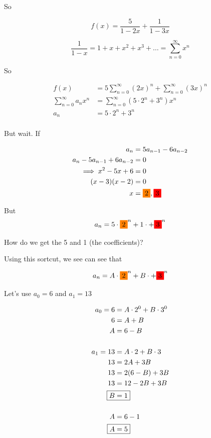 \documentclass[../../Main.tex]{subfiles}
\begin{document}
So

$$\boxed{f(x) = \frac{5}{1 - 2x} + \frac{1}{1 - 3x}}$$

\begin{recall}
    $$\frac{1}{1 - x} = 1 + x + x^2 + x^3 + \ldots = \sum_{n = 0}^{\infty} x^n$$ 
\end{recall}

So 

\begin{align*}
    f(x) &= 5 \sum_{n = 0}^{\infty} (2x)^n + \sum_{n = 0}^{\infty} (3x)^n \\
    \sum_{n = 0}^{\infty} a_n x^n &= \sum_{n = 0}^{\infty}(5 \cdot 2^n + 3^n)x^n \\
    a_n &= 5 \cdot 2^n + 3^n \\
\end{align*}

But wait. If

\begin{align*}
    a_n &= 5a_{n - 1} - 6a_{n - 2} \\
    a_n - 5a_{n - 1} + 6a_{n - 2} &= 0 \\
    \implies x^2 - 5x + 6 &= 0 \\
    (x - 3)(x - 2) &= 0 \\
    x &= \orangebox{2}, \redbox{3} \\
\end{align*}

But $$a_n = 5 \cdot \orangebox{2}^n + 1 \cdot + \redbox{3}^n$$

How do we get the 5 and 1 (the coefficients)?

Using this sortcut, we see can see that

$$a_n = A \cdot \orangebox{2}^n + B \cdot + \redbox{3}^n$$

Let's use $a_0 = 6$ and $a_1 = 13$

\begin{align*}
    a_0 = 6 &= A \cdot 2^0 + B \cdot 3^0 \\
    6 &= A + B \\
    A &= 6 - B \\
    \\
    a_1 = 13 &= A \cdot 2 + B \cdot 3 \\
    13 &= 2A + 3B \\
    13 &= 2(6 - B) + 3B \\
    13 &= 12 - 2B + 3B \\
    \Aboxed{B &= 1} \\
    \\
    A &= 6 - 1\\
    \Aboxed{A &= 5} \\
\end{align*}

\end{document}
